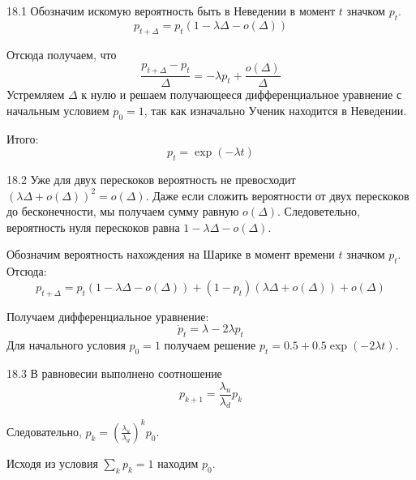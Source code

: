 \protect \hypertarget {soln:18.1}{}
\begin{solution}{{18.1}}
Обозначим искомую вероятность быть в Неведении в момент $t$ значком $p_t$.
\[
p_{t+\Delta} = p_t (1-\lambda\Delta - o(\Delta))
\]

Отсюда получаем, что
\[
\frac{p_{t+\Delta} - p_t}{\Delta} = -\lambda p_t + \frac{o(\Delta)}{\Delta}
\]
Устремляем $\Delta$ к нулю и решаем получающееся дифференциальное уравнение
с начальным условием $p_0 = 1$, так как изначально Ученик находится в Неведении.

Итого:
\[
p_t = \exp(-\lambda t)
\]
\end{solution}
\protect \hypertarget {soln:18.2}{}
\begin{solution}{{18.2}}
Уже для двух перескоков вероятность не превосходит $(\lambda\Delta + o(\Delta))^2 = o(\Delta)$.
Даже если сложить вероятности от двух перескоков до бесконечности,
мы получаем сумму равную $o(\Delta)$.
Следоветельно, вероятность нуля перескоков равна $1-\lambda\Delta - o(\Delta)$.

Обозначим вероятность нахождения на Шарике в момент времени $t$ значком $p_t$.
Отсюда:
\[
p_{t+\Delta} = p_t(1-\lambda\Delta - o(\Delta)) + (1-p_t)(\lambda\Delta + o(\Delta)) + o(\Delta)
\]

Получаем дифференциальное уравнение:
\[
\dot p_t = \lambda - 2\lambda p_t
\]
Для начального условия $p_0=1$ получаем решение $p_t = 0.5 + 0.5 \exp(-2\lambda t)$.
\end{solution}
\protect \hypertarget {soln:18.3}{}
\begin{solution}{{18.3}}
В равновесии выполнено соотношение
\[
p_{k+1} = \frac{\lambda_u}{\lambda_d} p_k
\]

Следовательно, $p_k = \left( \frac{\lambda_u}{\lambda_d}  \right)^k p_0$.

Исходя из условия $\sum_k p_k = 1$ находим $p_0$.

\end{solution}
\protect \hypertarget {soln:18.4}{}
